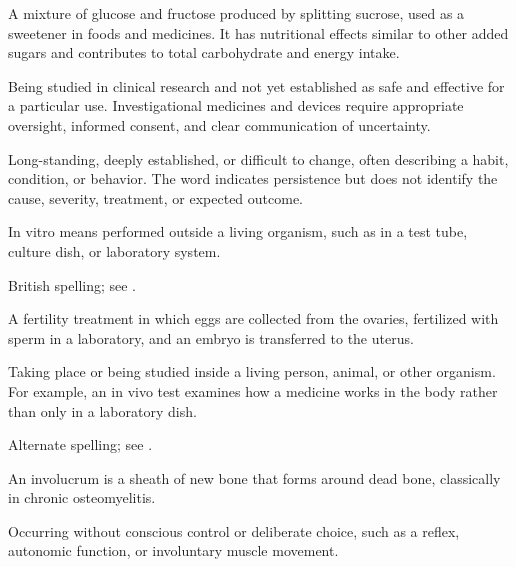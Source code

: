  A mixture of glucose and fructose produced by splitting sucrose, used as a sweetener in foods and medicines. It has nutritional effects similar to other added sugars and contributes to total carbohydrate and energy intake.

 Being studied in clinical research and not yet established as safe and effective for a particular use. Investigational medicines and devices require appropriate oversight, informed consent, and clear communication of uncertainty.

 Long-standing, deeply established, or difficult to change, often describing a habit, condition, or behavior. The word indicates persistence but does not identify the cause, severity, treatment, or expected outcome.

 In vitro means performed outside a living organism, such as in a test tube, culture dish, or laboratory system.

 British spelling; see .

 A fertility treatment in which eggs are collected from the ovaries, fertilized with sperm in a laboratory, and an embryo is transferred to the uterus.

 Taking place or being studied inside a living person, animal, or other organism. For example, an in vivo test examines how a medicine works in the body rather than only in a laboratory dish.

 Alternate spelling; see .

 An involucrum is a sheath of new bone that forms around dead bone, classically in chronic osteomyelitis.

 Occurring without conscious control or deliberate choice, such as a reflex, autonomic function, or involuntary muscle movement.


